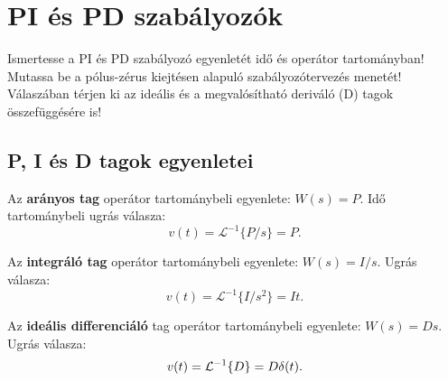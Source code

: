 \section{PI és PD szabályozók}

\begin{about}
  Ismertesse a PI és PD szabályozó egyenletét idő és operátor tartományban!
  Mutassa be a pólus-zérus kiejtésen alapuló szabályozótervezés menetét!
  Válaszában térjen ki az ideális és a megvalósítható deriváló (D) tagok
  összefüggésére is!
\end{about}

\subsection{P, I és D tagok egyenletei}


Az \textbf{arányos tag} operátor tartománybeli egyenlete: $W(s) = P$.
Idő tartománybeli ugrás válasza:
\begin{equation}
  v(t) = \mathcal{L}^{-1} \{ P / s \} = P.
  \label{eq:P-step}
\end{equation}


Az \textbf{integráló tag} operátor tartománybeli egyenlete: $W(s) = I/s$.
Ugrás válasza:
\begin{equation}
  v(t) = \mathcal L^{-1} \{ I / s^2 \} = I t.
  \label{eq:I-step}
\end{equation}


Az \textbf{ideális differenciáló} tag operátor tartománybeli egyenlete: $W(s) = Ds$.
Ugrás válasza:
\begin{equation}
  v(t) = \mathcal L^{-1} \{ D \} = D \delta(t).
  \label{eq:D-step}
\end{equation}


